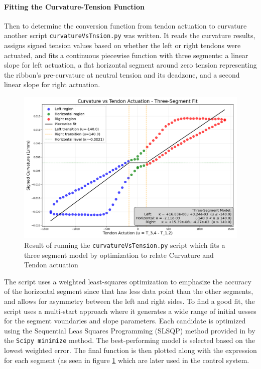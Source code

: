 \paragraph*{Fitting the Curvature-Tension Function}
Then to determine the conversion function from tendon actuation to curvature another script \texttt{curvatureVsTnsion.py} was written. It reads the curvature results, assigns signed tension values based on whether the left or right tendons were actuated, and fits a continuous piecewise function with three segments: a linear slope for left actuation, a flat horizontal segment around zero tension representing the ribbon’s pre-curvature at neutral tension and its deadzone, and a second linear slope for right actuation.
\begin{figure} [H]
    \centering
    \includegraphics[width=0.9\linewidth]{images/ribbonadapter/ribbonfit_2025-06-30_15-59-06.png}
    \caption{Result of running the \texttt{curvatureVsTension.py} script which fits a three segment model by optimization to relate Curvature and Tendon actuation}
    \label{fig:curvaturevstension}
\end{figure}
The script uses a weighted least-squares optimization to emphasize the accuracy of the horizontal segment since that has less data point than the other segments, and allows for asymmetry between the left and right sides. To find a good fit, the script uses a multi-start approach where it generates a wide range of initial uesses for the segment voundaries and slope parameters. Each candidate is optimized using the Sequential Leas Squares Programming (SLSQP) method provided in by the \texttt{Scipy minimize} method. The best-performing model is selected based on the lowest weighted error. The final function is then plotted along with the expression for each segment (as seen in figure \ref{fig:curvaturevstension} which are later used in the control system.


